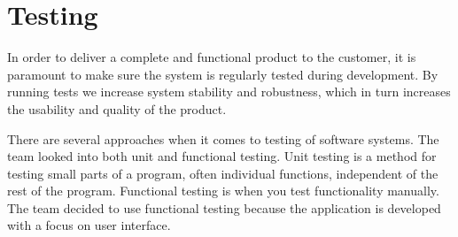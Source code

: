\chapter{Testing}

In order to deliver a complete and functional product to the customer, it is paramount to make sure the system is regularly tested during development. 
By running tests we increase system stability and robustness, which in turn increases the usability and quality of the product. 

There are several approaches when it comes to testing of software systems. The team looked into both \gls{unit} and functional testing. Unit testing is a method for testing small parts of a program, often individual functions, independent of the rest of the program. Functional testing is when you test functionality manually. The team decided to use functional testing because the application is developed with a focus on user interface.



